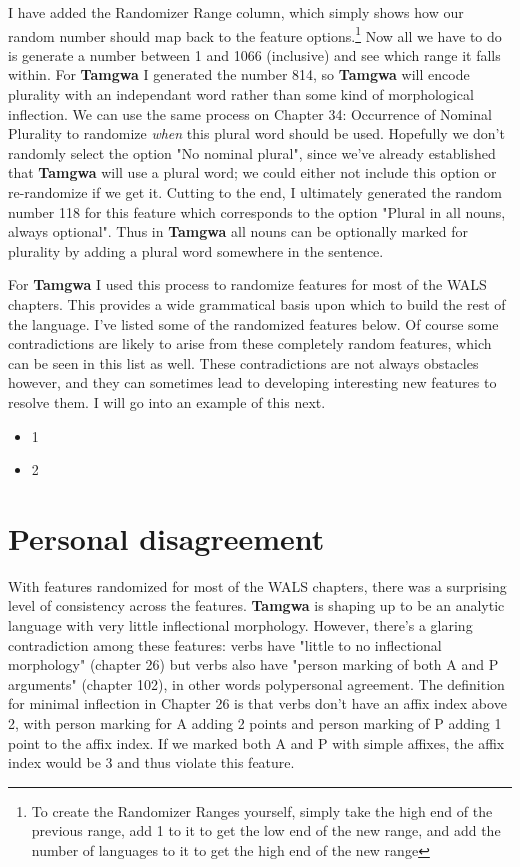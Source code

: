 \documentclass[a4paper,12pt,twoside,openright]{memoir}
\begin{document}
    I have added the Randomizer Range column, which simply shows how our random number should map back to the feature options.\footnote{To create the Randomizer Ranges yourself, simply take the high end of the previous range, add 1 to it to get the low end of the new range, and add the number of languages to it to get the high end of the new range}  Now all we have to do is generate a number between 1 and 1066 (inclusive) and see which range it falls within.  For \textbf{Tamgwa} I generated the number 814, so \textbf{Tamgwa} will encode plurality with an independant word rather than some kind of morphological inflection.  We can use the same process on Chapter 34: Occurrence of Nominal Plurality to randomize \textit{when} this plural word should be used.  Hopefully we don't randomly select the option "No nominal plural", since we've already established that \textbf{Tamgwa} will use a plural word; we could either not include this option or re-randomize if we get it.  Cutting to the end, I ultimately generated the random number 118 for this feature which corresponds to the option "Plural in all nouns, always optional".  Thus in \textbf{Tamgwa} all nouns can be optionally marked for plurality by adding a plural word somewhere in the sentence.

    For \textbf{Tamgwa} I used this process to randomize features for most of the WALS chapters.  This provides a wide grammatical basis upon which to build the rest of the language.  I've listed some of the randomized features below.  Of course some contradictions are likely to arise from these completely random features, which can be seen in this list as well.  These contradictions are not always obstacles however, and they can sometimes lead to developing interesting new features to resolve them.  I will go into an example of this next.

\begin{itemize}
    \item 1
    \item 2
\end{itemize}

\section*{Personal disagreement} %

    With features randomized for most of the WALS chapters, there was a surprising level of consistency across the features.  \textbf{Tamgwa} is shaping up to be an analytic language with very little inflectional morphology. However, there's a glaring contradiction among these features: verbs have "little to no inflectional morphology" (chapter 26) but verbs also have "person marking of both A and P arguments" (chapter 102), in other words polypersonal agreement.  The definition for minimal inflection in Chapter 26 is that verbs don't have an affix index above 2, with person marking for A adding 2 points and person marking of P adding 1 point to the affix index.  If we marked both A and P with simple affixes, the affix index would be 3 and thus violate this feature.
\end{document}
